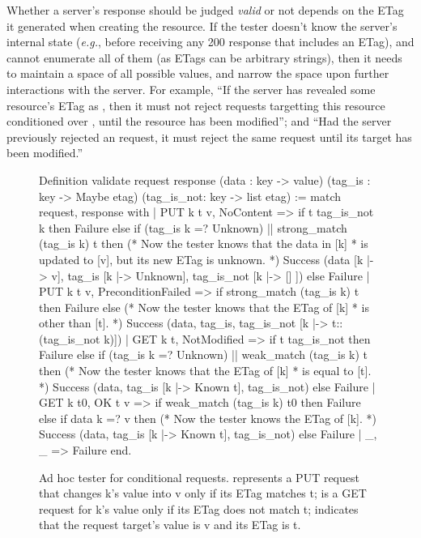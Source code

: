 Whether a server's response should be judged {\em valid} or not depends on the
ETag it generated when creating the resource.  If the tester doesn't know the
server's internal state ({\it e.g.}, before receiving any 200 response that
includes an ETag), and cannot enumerate all of them (as ETags can be arbitrary
strings), then it needs to maintain a space of all possible values, and narrow
the space upon further interactions with the server.  For example, ``If the
server has revealed some resource's ETag as , then it must
not reject requests targetting this resource conditioned over , until the resource has been modified''; and ``Had the server
previously rejected an  request, it must reject the same
request until its target has been modified.''

\begin{figure}
\begin{coq}
  Definition validate request response
             (data      : key -> value)
             (tag_is    : key -> Maybe etag)
             (tag_is_not: key -> list etag) :=
    match request, response with
    | PUT k t v, NoContent => 
      if t \in tag_is_not k then Failure
      else if (tag_is k =? Unknown) || strong_match (tag_is k) t
      then (* Now the tester knows that the data in [k]
            * is updated to [v], but its new ETag is unknown. *)
        Success (data       [k |-> v],
                 tag_is     [k |-> Unknown],
                 tag_is_not [k |-> [] ])
      else Failure
    | PUT k t v, PreconditionFailed =>
      if strong_match (tag_is k) t then Failure
      else (* Now the tester knows that the ETag of [k]
            * is other than [t]. *)
        Success (data, tag_is, tag_is_not [k |-> t::(tag_is_not k)])
    | GET k t, NotModified =>
      if t \in tag_is_not then Failure
      else if (tag_is k =? Unknown) || weak_match (tag_is k) t
      then (* Now the tester knows that the ETag of [k]
            * is equal to [t]. *)
        Success (data, tag_is [k |-> Known t], tag_is_not)
      else Failure
    | GET k t0, OK t v =>
      if weak_match (tag_is k) t0 then Failure
      else if data k =? v
      then (* Now the tester knows the ETag of [k]. *)
        Success (data, tag_is [k |-> Known t], tag_is_not)
      else Failure
    | _, _ => Failure
    end.
\end{coq}
  \caption[Ad hoc tester for \http conditional requests.]{Ad hoc tester for
    \http conditional requests.   represents a PUT request that
    changes \ilc k's value into \ilc v only if its ETag matches \ilc t;  is a GET request for \ilc k's value only if its ETag does not match
    \ilc t;  indicates that the request target's value is \ilc v and
    its ETag is \ilc t.}
  \label{fig:etag-tester}
\end{figure}

